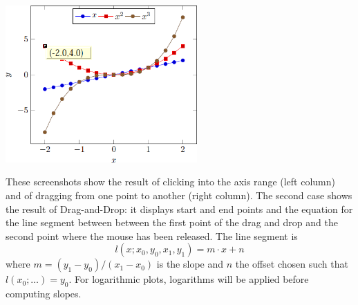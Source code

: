     \includegraphics[height=6cm]{figures/pgfplotsclickable-fig1.png}
    \hfill

\nobreak These screenshots show the result of clicking into the axis range
(left column) and of dragging from one point to another (right column). The
second case shows the result of Drag-and-Drop: it displays start and end points
and the equation for the line segment between between the first point of the
drag and drop and the second point where the mouse has been released. The line
segment is
%
    \[ l(x; x_0,y_0,x_1,y_1) = m \cdot x + n \]
%
where $m = (y_1-y_0) / (x_1-x_0)$ is the slope and $n$ the offset chosen such
that $l(x_0;\dotsc) = y_0$. For logarithmic plots, logarithms will be applied
before computing slopes.

